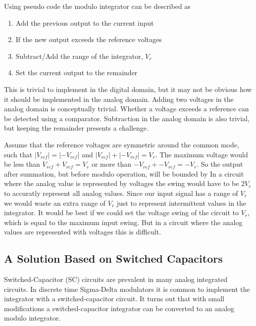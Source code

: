 Using pseudo code the modulo integrator can be described as
\begin{enumerate}
\item Add the previous output to the current input
\item If the new output exceeds the reference voltages
\item Subtract/Add the range of the integrator, $V_r$ 
\item Set the current output to the remainder
\end{enumerate}

This is trivial to implement in the digital domain, but it may not be obvious how it
should be implemented in the
analog domain. Adding two voltages in the analog domain is conceptually
trivial. Whether a voltage exceeds a reference can be detected using a
comparator. Subtraction in the analog domain is also trivial, but
keeping the remainder presents a challenge. 

Assume that the reference voltages are
symmetric around the common mode, such that $|V_{ref}| =
|-V_{ref}|$ and $|V_{ref}|+ |-V_{ref}| = V_r$. The maximum voltage
would be less than $V_{ref} + V_{ref} = V_r$ or more than $-V_{ref} + -V_{ref} = -V_r$.  So the output after
summation, but before modulo operation, will be bounded by
In a circuit where the analog value is represented by voltages the swing would have to be $2V_r$ to
accuratly represent all analog values. Since our input signal has a range
of $V_r$ we would waste an extra range of $V_r$ just to represent
intermittent values in the integrator. It would be best if we could
set the voltage swing of the circuit to $V_r$, which is equal to the
maximum input swing. But in a circuit where the analog values are
represented with voltages this is difficult.

\subsection{A Solution Based on Switched Capacitors}
Switched-Capacitor (SC) circuits are prevalent in many analog
integrated circuits. In discrete time Sigma-Delta modulators it is common to
implement the integrator with a switched-capacitor circuit. It turns out that with small
modifications a switched-capacitor integrator can be converted to an analog modulo integrator. 

